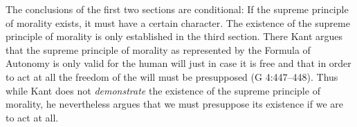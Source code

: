 
The conclusions of the first two sections are conditional: If the supreme principle of morality exists, it must have a certain character. The existence of the supreme principle of morality is only established in the third section. There Kant argues that the supreme principle of morality as represented by the Formula of Autonomy is only valid for the human will just in case it is free and that in order to act at all the freedom of the will must be presupposed (G 4:447–448). Thus while Kant does not \emph{demonstrate} the existence of the supreme principle of morality, he nevertheless argues that we must presuppose its existence if we are to act at all.

